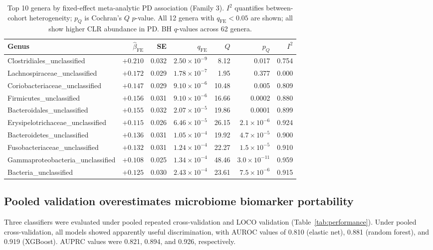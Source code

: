 \documentclass[12pt,a4paper]{article}
\begin{document}
\begin{table}[h]
\centering
\caption{Top 10 genera by fixed-effect meta-analytic PD association
(Family 3). $I^2$ quantifies between-cohort heterogeneity; $p_Q$ is
Cochran's $Q$ $p$-value. All 12 genera with $q_{\mathrm{FE}} < 0.05$ are
shown; all show higher CLR abundance in PD. BH $q$-values across 62 genera.}
\label{tab:het-top}
\begin{tabular}{lrrrrrr}
\toprule
Genus & $\hat\beta_{\mathrm{FE}}$ & SE & $q_{\mathrm{FE}}$ &
  $Q$ & $p_Q$ & $I^2$ \\
\midrule
Clostridiales\_unclassified      & $+0.210$ & 0.032 & $2.50\times10^{-9}$  & 8.12  & 0.017 & 0.754 \\
Lachnospiraceae\_unclassified    & $+0.172$ & 0.029 & $1.78\times10^{-7}$  & 1.95  & 0.377 & 0.000 \\
Coriobacteriaceae\_unclassified  & $+0.147$ & 0.029 & $9.10\times10^{-6}$  & 10.48 & 0.005 & 0.809 \\
Firmicutes\_unclassified         & $+0.156$ & 0.031 & $9.10\times10^{-6}$  & 16.66 & 0.0002& 0.880 \\
Bacteroidales\_unclassified      & $+0.155$ & 0.032 & $2.07\times10^{-5}$  & 19.86 & 0.0001& 0.899 \\
Erysipelotrichaceae\_unclassified& $+0.115$ & 0.026 & $6.46\times10^{-5}$  & 26.15 & $2.1\times10^{-6}$ & 0.924 \\
Bacteroidetes\_unclassified      & $+0.136$ & 0.031 & $1.05\times10^{-4}$  & 19.92 & $4.7\times10^{-5}$ & 0.900 \\
Fusobacteriaceae\_unclassified   & $+0.132$ & 0.031 & $1.24\times10^{-4}$  & 22.27 & $1.5\times10^{-5}$ & 0.910 \\
Gammaproteobacteria\_unclassified& $+0.108$ & 0.025 & $1.34\times10^{-4}$  & 48.46 & $3.0\times10^{-11}$& 0.959 \\
Bacteria\_unclassified           & $+0.125$ & 0.030 & $2.43\times10^{-4}$  & 23.61 & $7.5\times10^{-6}$ & 0.915 \\
\bottomrule
\end{tabular}
\end{table}

\subsection{Pooled validation overestimates microbiome biomarker portability}
\label{sec:ml}

Three classifiers were evaluated under pooled repeated cross-validation
and LOCO validation (Table~\ref{tab:performance}). Under pooled
cross-validation, all models showed apparently useful discrimination, with
AUROC values of 0.810 (elastic net), 0.881 (random forest), and 0.919
(XGBoost). AUPRC values were 0.821, 0.894, and 0.926, respectively.
\end{document}
